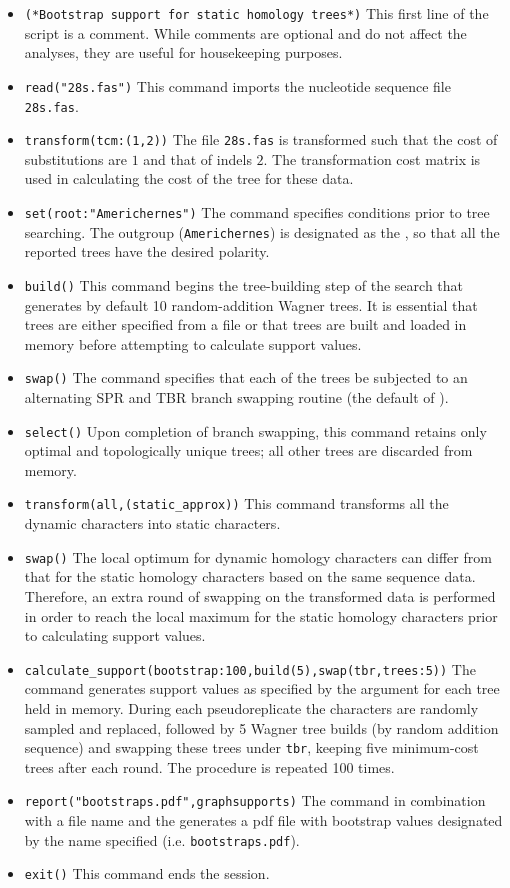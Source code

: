 \begin{itemize}
\item \texttt{(*Bootstrap support for static homology trees*)} This first line of the script is a comment. While
 comments are optional and do not affect the analyses, they are useful for housekeeping purposes.
\item \texttt{read("28s.fas")} This command imports the nucleotide sequence file \texttt{28s.fas}.
\item \texttt{transform(tcm:(1,2))} The file \texttt{28s.fas} is transformed such that the cost of substitutions 
are $1$ and that of indels $2$.  The transformation cost matrix is used in calculating the cost of the tree
for these data.
\item \texttt{set(root:"Americhernes")} The  command specifies conditions prior to tree 
searching. The outgroup (\texttt{Americhernes}) is designated as the , so that all the reported 
trees have the desired polarity.     
\item \texttt{build()} This command begins the tree-building step of the search that generates by default 10 
random-addition Wagner trees. It is essential that trees are either specified from a file or that trees are built and loaded in 
memory before attempting to calculate support values.
\item \texttt{swap()} The  command specifies that each of the trees be subjected to an 
alternating SPR and TBR branch swapping routine (the default of \poy).
\item \texttt{select()} Upon completion of branch swapping, this command retains only optimal and topologically 
unique trees; all other trees are discarded from memory. 
\item \texttt{transform(all,(static\_approx))} This command transforms all the dynamic characters into static characters.
\item \texttt{swap()} The local optimum for dynamic homology characters can differ from that for the static 
homology characters based on the same sequence data. Therefore, an extra round of swapping on the transformed 
data is performed in order to reach the local maximum for the static homology characters prior to calculating support values.
\item \texttt{calculate\_support(bootstrap:100,build(5),swap(tbr,trees:5))} The  
command generates support values as specified by the  argument for each tree held in 
memory. During each pseudoreplicate the characters are randomly sampled and replaced, followed by 5 Wagner 
tree builds (by random addition sequence) and swapping these trees under \texttt{tbr}, keeping five minimum-cost trees
after each round. The procedure is repeated 100 times.
\item \texttt{report("bootstraps.pdf",graphsupports)}  The  command in combination with 
a file name and the  generates a pdf file with bootstrap values designated by the 
name specified (i.e. \texttt{bootstraps.pdf}). 
\item \texttt{exit()} This command ends the \poy session.
\end{itemize}

